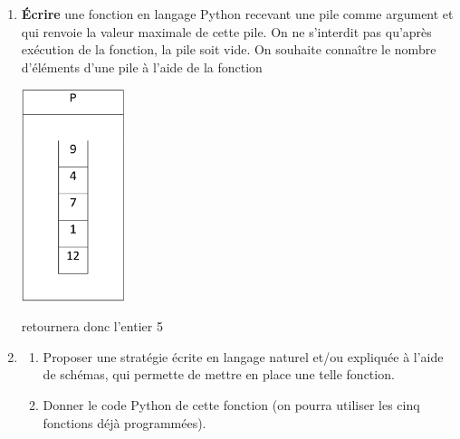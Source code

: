 \documentclass[11pt,a4paper,french,twoside]{PMCours}
\begin{document}
\begin{enumerate}
    \item \textbf{Écrire} une fonction en langage Python  recevant une pile  comme
    argument et qui renvoie la valeur maximale de cette pile. On ne s'interdit pas
    qu'après exécution de la fonction, la pile soit vide.
    On souhaite connaître le nombre d'éléments d'une pile à l'aide de la fonction 
    \begin{center}
    \includegraphics[width=3cm]{BacBlanc2Sujet1_NSI2122-img5.png}
    
     retournera donc l'entier 5
    \end{center}
    \item
\begin{enumerate}
    \item Proposer une stratégie écrite en langage naturel et/ou expliquée à l'aide de
    schémas, qui permette de mettre en place une telle fonction.
    \item Donner le code Python de cette fonction  (on pourra utiliser les
    cinq fonctions déjà programmées).
\end{enumerate}
\end{enumerate}
    
    
\end{document}

